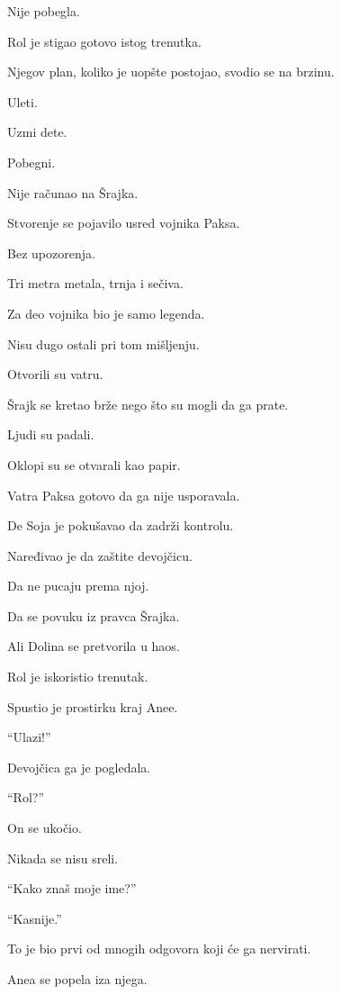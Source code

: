 Nije pobegla.

\bigskip

Rol je stigao gotovo istog trenutka.

Njegov plan, koliko je uopšte postojao, svodio se na brzinu.

Uleti.

Uzmi dete.

Pobegni.

\bigskip

Nije računao na Šrajka.

\bigskip

Stvorenje se pojavilo usred vojnika Paksa.

Bez upozorenja.

Tri metra metala, trnja i sečiva.

Za deo vojnika bio je samo legenda.

Nisu dugo ostali pri tom mišljenju.

\bigskip

Otvorili su vatru.

Šrajk se kretao brže nego što su mogli da ga prate.

Ljudi su padali.

Oklopi su se otvarali kao papir.

Vatra Paksa gotovo da ga nije usporavala.

\bigskip

De Soja je pokušavao da zadrži kontrolu.

Naređivao je da zaštite devojčicu.

Da ne pucaju prema njoj.

Da se povuku iz pravca Šrajka.

Ali Dolina se pretvorila u haos.

\bigskip

Rol je iskoristio trenutak.

Spustio je prostirku kraj Anee.

``Ulazi!''

Devojčica ga je pogledala.

``Rol?''

On se ukočio.

Nikada se nisu sreli.

``Kako znaš moje ime?''

``Kasnije.''

To je bio prvi od mnogih odgovora koji će ga nervirati.

\bigskip

Anea se popela iza njega.

